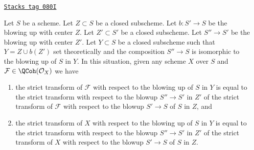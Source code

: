 \begin{lemma}
\label{divisors-lemma-strict-transform-composition-blowups}
\href{https://stacks.math.columbia.edu/tag/080I}{\texttt{Stacks tag 080I}}

Let $S$ be a scheme. Let $Z \subset S$ be a closed subscheme.
Let $b : S' \to S$ be the blowing up with center $Z$. Let $Z' \subset S'$ be
a closed subscheme. Let $S'' \to S'$ be the blowing up with center $Z'$.
Let $Y \subset S$ be a closed subscheme such that
$Y = Z \cup b(Z')$ set theoretically and the composition $S'' \to S$
is isomorphic to the blowing up of $S$ in $Y$.
In this situation, given any scheme $X$ over $S$ and
$\mathcal{F} \in \QCoh(\mathcal{O}_X)$ we have
\begin{enumerate}
\item the strict transform of $\mathcal{F}$ with respect to the blowing
up of $S$ in $Y$ is equal to the strict transform with respect to the
blowup $S'' \to S'$ in $Z'$ of the strict transform of $\mathcal{F}$
with respect to the blowup $S' \to S$ of $S$ in $Z$, and
\item the strict transform of $X$ with respect to the blowing
up of $S$ in $Y$ is equal to the strict transform with respect to the
blowup $S'' \to S'$ in $Z'$ of the strict transform of $X$
with respect to the blowup $S' \to S$ of $S$ in $Z$.
\end{enumerate}
\end{lemma}

